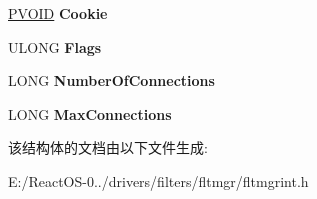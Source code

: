 \begin{DoxyCompactItemize}
\hyperlink{interfacevoid}{P\+V\+O\+ID} {\bfseries Cookie}
\item 
\mbox{\label{struct___f_l_t___s_e_r_v_e_r___p_o_r_t___o_b_j_e_c_t_a2fc37012eeb0680d708fdabefb794e8f}} 
U\+L\+O\+NG {\bfseries Flags}
\item 
\mbox{\label{struct___f_l_t___s_e_r_v_e_r___p_o_r_t___o_b_j_e_c_t_a1958a64e04f35a2a631aa389a6b04cb7}} 
L\+O\+NG {\bfseries Number\+Of\+Connections}
\item 
\mbox{\label{struct___f_l_t___s_e_r_v_e_r___p_o_r_t___o_b_j_e_c_t_a38c719137f5fe8b4d3e639d8e67f1031}} 
L\+O\+NG {\bfseries Max\+Connections}
\end{DoxyCompactItemize}


该结构体的文档由以下文件生成\+:\begin{DoxyCompactItemize}
\item 
E\+:/\+React\+O\+S-\/0../drivers/filters/fltmgr/fltmgrint.\+h\end{DoxyCompactItemize}
